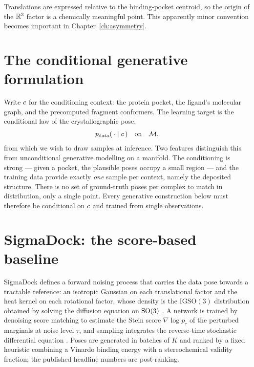 Translations are expressed relative to the binding-pocket centroid, so the
origin of the $\mathbb{R}^3$ factor is a chemically meaningful point. This apparently
minor convention becomes important in Chapter~\ref{ch:asymmetry}.

\section{The conditional generative formulation}

Write $c$ for the conditioning context: the protein pocket, the ligand's
molecular graph, and the precomputed fragment conformers. The learning target
is the conditional law of the crystallographic pose,
\begin{equation}
  p_{\mathrm{data}}(\,\cdot \mid c\,) \quad\text{on}\quad \mathcal{M} ,
\end{equation}
from which we wish to draw samples at inference. Two features distinguish this
from unconditional generative modelling on a manifold. The conditioning is
strong --- given a pocket, the plausible poses occupy a small region --- and
the training data provide exactly \emph{one} sample per context, namely the
deposited structure. There is no set of ground-truth poses per complex to
match in distribution, only a single point. Every generative construction
below must therefore be conditional on $c$ and trained from single
observations.

\section{SigmaDock: the score-based baseline}
\label{sec:sigmadock}

SigmaDock defines a forward noising process that carries the data pose towards
a tractable reference: an isotropic Gaussian on each translational factor and
the heat kernel on each rotational factor, whose density is the
$\mathrm{IGSO}(3)$ distribution obtained by solving the diffusion equation on
$\mathrm{SO}(3)$ \citep{leach2022so3, yim2023se3}. A network is trained by denoising
score matching \citep{vincent2011connection, song2019ncsn} to estimate the
Stein score $\nabla \log p_\tau$ of the perturbed marginals at noise level
$\tau$, and sampling integrates the reverse-time stochastic differential
equation \citep{song2021sde}. Poses are generated in batches of $K$ and ranked
by a fixed heuristic combining a Vinardo binding energy
\citep{quiroga2016vinardo} with a stereochemical validity fraction; the
published headline numbers are post-ranking.

